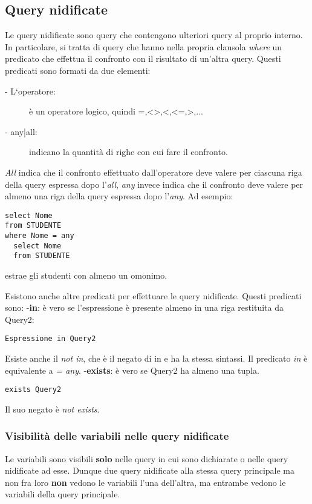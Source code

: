 \documentclass[\main/main.tex]{subfiles}
\begin{document}
\subsection{Query nidificate}
Le query nidificate sono query che contengono ulteriori query al proprio interno.
In particolare, si tratta di query che hanno nella propria clausola \textit{where} un predicato che effettua il confronto con il risultato di un'altra query.
Questi predicati sono formati da due elementi:
\begin{description}
  \item[- L`operatore:] è un operatore logico, quindi =,<>,<,<=,>,...
  \item[- any|all:] indicano la quantità di righe con cui fare il confronto.
\end{description}
\textit{All} indica che il confronto effettuato dall'operatore deve valere per ciascuna riga della query espressa dopo l'\textit{all}, \textit{any} invece indica che il confronto deve valere per almeno una riga della query espressa dopo l'\textit{any}.
Ad esempio:
\begin{verbatim}
select Nome
from STUDENTE
where Nome = any
  select Nome
  from STUDENTE
\end{verbatim}
estrae gli studenti con almeno un omonimo.

Esistono anche altre predicati per effettuare le query nidificate.
Questi predicati sono:
-\textbf{in}: è vero se l'espressione è presente almeno in una riga restituita da Query2:
\begin{verbatim}
Espressione in Query2
\end{verbatim}
Esiste anche il \textit{not in}, che è il negato di in e ha la stessa sintassi.
Il predicato \textit{in} è equivalente a \textit{= any}.
-\textbf{exists}: è vero se Query2 ha almeno una tupla.
\begin{verbatim}
exists Query2
\end{verbatim}
Il suo negato è \textit{not exists}.

\subsubsection{Visibilità delle variabili nelle query nidificate}
Le variabili sono visibili \textbf{solo} nelle query in cui sono dichiarate o nelle query nidificate ad esse.
Dunque due query nidificate alla stessa query principale ma non fra loro \textbf{non} vedono le variabili l'una dell'altra, ma entrambe vedono le variabili della query principale.
\end{document}
